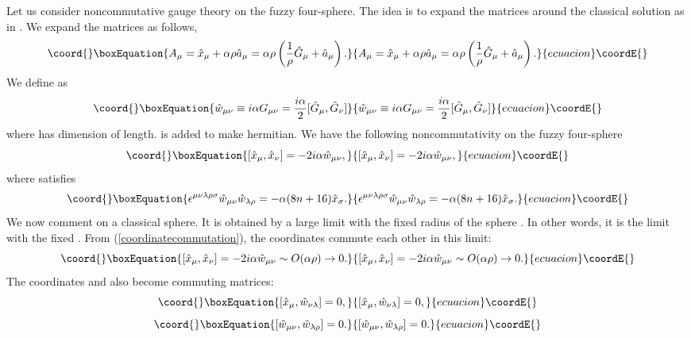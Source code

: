 \documentclass[a4paper,11pt]{article}
\begin{document}
Let us consider noncommutative gauge theory on the fuzzy four-sphere. 
The idea is to expand the matrices around the classical solution as in 
\cite{AIIKKT,IKTW,yk2}. 
We expand the matrices as follows, 
\begin{equation}\coord{}\boxEquation{
A_{\mu}=\hat{x}_{\mu}+ \alpha \rho \hat{a}_{\mu} 
=\alpha\rho \left( \frac{1}{\rho}\hat{G}_{\mu}+ \hat{a}_{\mu} \right). 
\label{expansionmatrices}
}{
A_{\mu}=\hat{x}_{\mu}+ \alpha \rho \hat{a}_{\mu} 
=\alpha\rho \left( \frac{1}{\rho}\hat{G}_{\mu}+ \hat{a}_{\mu} \right). 
}{ecuacion}\coordE{}\end{equation}
We define \coordHE{} as 
\begin{equation}\coord{}\boxEquation{
\hat{w}_{\mu\nu}\equiv i\alpha G_{\mu\nu}=
\frac{i\alpha}{2}[\hat{G}_{\mu},\hat{G}_{\nu}]
}{
\hat{w}_{\mu\nu}\equiv i\alpha G_{\mu\nu}=
\frac{i\alpha}{2}[\hat{G}_{\mu},\hat{G}_{\nu}]
}{ecuacion}\coordE{}\end{equation}
where \myHighlight{$\alpha$}\coordHE{} has dimension of length. 
\coordHE{} is added to make \coordHE{} hermitian. 
We have the following noncommutativity on the fuzzy four-sphere 
\begin{equation}\coord{}\boxEquation{
[\hat{x}_{\mu},\hat{x}_{\nu}]=-2i\alpha\hat{w}_{\mu\nu}, 
\label{coordinatecommutation}
}{
[\hat{x}_{\mu},\hat{x}_{\nu}]=-2i\alpha\hat{w}_{\mu\nu}, 
}{ecuacion}\coordE{}\end{equation}
where \coordHE{} satisfies 
\begin{equation}\coord{}\boxEquation{
\epsilon^{\mu\nu\lambda\rho\sigma}\hat{w}_{\mu\nu}
\hat{w}_{\lambda\rho}
=-\alpha(8n+16)\hat{x}_{\sigma}.  
}{
\epsilon^{\mu\nu\lambda\rho\sigma}\hat{w}_{\mu\nu}
\hat{w}_{\lambda\rho}
=-\alpha(8n+16)\hat{x}_{\sigma}.  
}{ecuacion}\coordE{}\end{equation} 
We now comment on a classical sphere. 
It is obtained by a large \coordHE{} limit with 
the fixed radius of the sphere \myHighlight{$\rho$}\coordHE{}. In other words, it is 
the \coordHE{} limit 
with the fixed \myHighlight{$\rho$}\coordHE{}.
From (\ref{coordinatecommutation}), 
the coordinates commute each other 
in this limit:
\begin{equation}\coord{}\boxEquation{
[\hat{x}_{\mu},\hat{x}_{\nu}]=-2i\alpha\hat{w}_{\mu\nu}
 \sim O (\alpha \rho) \rightarrow 0.
}{
[\hat{x}_{\mu},\hat{x}_{\nu}]=-2i\alpha\hat{w}_{\mu\nu}
 \sim O (\alpha \rho) \rightarrow 0.
}{ecuacion}\coordE{}\end{equation}
The coordinates \coordHE{} and \coordHE{} 
also become commuting matrices: 
\begin{equation}\coord{}\boxEquation{
[\hat{x}_{\mu},\hat{w}_{\nu\lambda}]=0, 
}{
[\hat{x}_{\mu},\hat{w}_{\nu\lambda}]=0, 
}{ecuacion}\coordE{}\end{equation}
\begin{equation}\coord{}\boxEquation{
[\hat{w}_{\mu\nu},\hat{w}_{\lambda\rho}]=0 .
}{
[\hat{w}_{\mu\nu},\hat{w}_{\lambda\rho}]=0 .
}{ecuacion}\coordE{}\end{equation}
\end{document}
